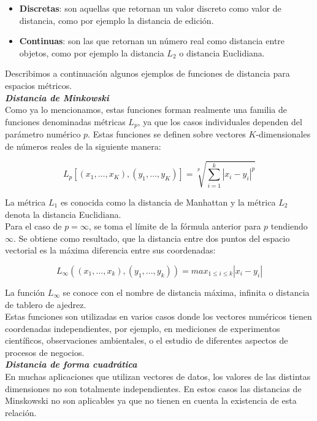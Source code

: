\begin{itemize}
\item \textbf{Discretas}: son  aquellas que retornan un valor discreto como valor de distancia, como por ejemplo la distancia de edici\'on.
\item \textbf{Continuas}: son las que retornan un n\'umero real como distancia entre objetos, como por ejemplo la distancia $L_2$ o distancia Euclidiana.
\end{itemize}

Describimos a continuaci\'on algunos ejemplos de funciones de distancia para espacios m\'etricos. \\

\noindent \textbf{\textit{Distancia de Minkowski}} \\

Como ya lo mencionamos, estas funciones forman realmente una familia de funciones denominadas m\'etricas $L_p$, ya que los casos individuales dependen del par\'ametro num\'erico $p$. Estas funciones se definen sobre vectores $K$-dimensionales de n\'umeros reales de la siguiente manera:

\[
L_p[(x_1,\ldots,x_K),(y_1,\ldots,y_K)] = \sqrt[p]{ \sum_{i=1}^k|x_i - y_i|^p}
\]

La m\'etrica $L_1$ es conocida como la distancia de Manhattan y la m\'etrica $L_2$ denota la distancia Euclidiana.\\

Para el caso de $p=\infty$, se toma el l\'imite de la f\'ormula anterior para $p$ tendiendo $\infty$. Se obtiene como resultado, que la distancia entre dos puntos del espacio vectorial es la m\'axima diferencia entre sus coordenadas:

\[
L_{\infty}((x_1,...,x_k), (y_1,...,y_k)) = max_{1 \leq i \leq k} |x_i - y_i |
\]

La funci\'on $L_{\infty}$ se conoce con el nombre de  distancia m\'axima, infinita o distancia de tablero de ajedrez.\\

Estas funciones son utilizadas en varios casos donde los vectores num\'ericos tienen coordenadas independientes, por ejemplo, en mediciones de experimentos cient\'ificos, observaciones ambientales, o el estudio de diferentes aspectos de procesos de negocios.\\

\noindent \textbf{\textit{Distancia de  forma cuadr\'atica}}\\

En muchas aplicaciones que utilizan vectores de datos, los valores de las distintas dimensiones no son totalmente independientes. En estos casos las distancias de Minskowski no son aplicables ya que no tienen en cuenta la existencia de esta relaci\'on.\\

